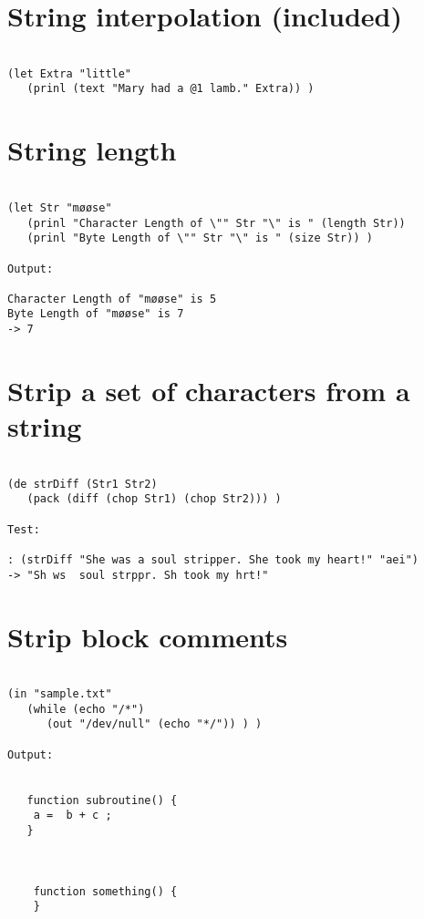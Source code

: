 \section*{String interpolation (included)}

\begin{verbatim}

(let Extra "little"
   (prinl (text "Mary had a @1 lamb." Extra)) )

\end{verbatim}

\section*{String length}

\begin{verbatim}

(let Str "møøse"
   (prinl "Character Length of \"" Str "\" is " (length Str))
   (prinl "Byte Length of \"" Str "\" is " (size Str)) )

Output:

Character Length of "møøse" is 5
Byte Length of "møøse" is 7
-> 7

\end{verbatim}

\section*{Strip a set of characters from a string}

\begin{verbatim}

(de strDiff (Str1 Str2)
   (pack (diff (chop Str1) (chop Str2))) )

Test:

: (strDiff "She was a soul stripper. She took my heart!" "aei")
-> "Sh ws  soul strppr. Sh took my hrt!"

\end{verbatim}

\section*{Strip block comments}

\begin{verbatim}

(in "sample.txt"
   (while (echo "/*")
      (out "/dev/null" (echo "*/")) ) )

Output:


   function subroutine() {
    a =  b + c ;
   }



    function something() {
    }

\end{verbatim}

